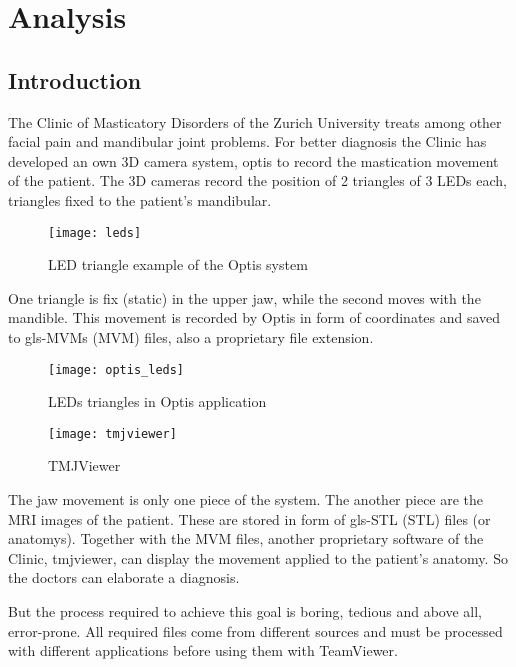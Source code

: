 \section{Analysis}
\subsection{Introduction}

The Clinic of Masticatory Disorders of the Zurich University treats among other facial pain and mandibular joint problems. For better diagnosis the Clinic has developed an own 3D camera system, \gls{optis} to record the mastication movement of the patient. The 3D cameras record the position of 2 triangles of 3 LEDs each, triangles fixed to the patient's mandibular.


\begin{figure}[h!]
	\centering
	\texttt{[image: leds]}
	\caption{LED triangle example of the Optis system }
\end{figure}

\noindent One triangle is fix (static) in the upper jaw, while the second moves with the mandible. This movement is recorded by Optis in form of coordinates and saved to \glspl{gls-MVM} (MVM) files, also a proprietary file extension.

\begin{figure}[h!]
	\centering
	\texttt{[image: optis\_leds]}
	\caption{LEDs triangles in Optis application}
\end{figure}



\begin{wrapfigure}{r}{0.4\textwidth}
\begin{center}
	\texttt{[image: tmjviewer]}
	\caption{TMJViewer}
\end{center}
\end{wrapfigure}
The jaw movement is only one piece of the system. The another piece are the MRI images of the patient. These are stored in form of \gls{gls-STL} (STL) files (or \glspl{anatomy}). Together with the MVM files, another proprietary software of the Clinic, \gls{tmjviewer}, can display the movement applied to the patient's anatomy. So the doctors can elaborate a diagnosis.

But the process required to achieve this goal is boring, tedious and above all, error-prone. All required files come from different sources and must be processed with different applications before using them with TeamViewer.

